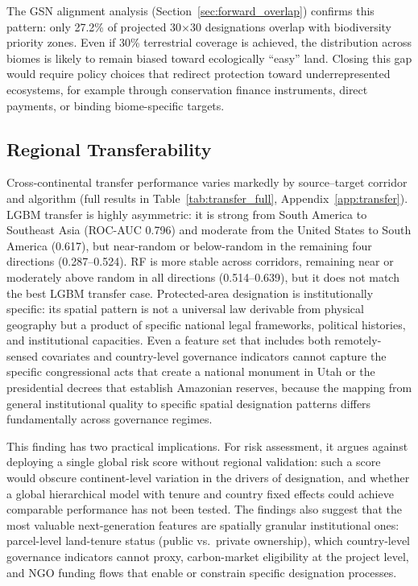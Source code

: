 \documentclass[12pt]{article}
\theoremstyle{break}
\begin{document}
The GSN alignment analysis (Section~\ref{sec:forward_overlap}) confirms this
pattern: only 27.2\% of projected 30$\times$30 designations overlap with biodiversity
priority zones. Even if 30\% terrestrial coverage is achieved, the distribution
across biomes is likely to remain biased toward ecologically ``easy'' land. Closing
this gap would require policy choices that redirect protection toward
underrepresented ecosystems, for example through conservation finance instruments,
direct payments, or binding biome-specific targets.

\subsection{Regional Transferability}
\label{sec:disc_transfer}
Cross-continental transfer performance varies markedly by source--target corridor
and algorithm (full results in Table~\ref{tab:transfer_full},
Appendix~\ref{app:transfer}). LGBM transfer is highly asymmetric: it is strong from
South America to Southeast Asia (ROC-AUC 0.796) and moderate from the United States
to South America (0.617), but near-random or below-random in the remaining four
directions (0.287--0.524). RF is more stable across corridors, remaining near or
moderately above random in all directions (0.514--0.639), but it does not match the
best LGBM transfer case.
Protected-area designation is institutionally specific: its spatial pattern
is not a universal law derivable from physical geography but a product of specific
national legal frameworks, political histories, and institutional capacities.
Even a feature set that includes both remotely-sensed covariates and country-level
governance indicators cannot capture the specific congressional acts that create
a national monument in Utah or the presidential decrees that establish Amazonian
reserves, because the mapping from general institutional quality to specific
spatial designation patterns differs fundamentally across governance regimes.

This finding has two practical implications. For risk assessment, it argues against
deploying a single global risk score without regional validation: such a score would
obscure continent-level variation in the drivers of designation, and whether a global
hierarchical model with tenure and country fixed effects could achieve comparable
performance has not been tested. The findings also suggest
that the most valuable next-generation features are spatially granular institutional
ones: parcel-level land-tenure status (public vs.\ private ownership), which country-level
governance indicators cannot proxy, carbon-market eligibility at the project level,
and NGO funding flows that enable or constrain specific designation processes.
\end{document}
